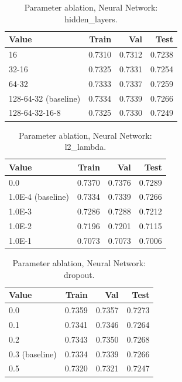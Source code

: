 
\begin{table}[ht]
\centering
\small
\caption{Parameter ablation, Neural Network: hidden\_layers.}
\label{tab:ablation-neural-hidden-layers}
\begin{tabular}{lrrr}
\toprule
Value & Train & Val & Test \\
\midrule
16 & 0.7310 & 0.7312 & 0.7238 \\
32-16 & 0.7325 & 0.7331 & 0.7254 \\
64-32 & 0.7333 & 0.7337 & 0.7259 \\
128-64-32 (baseline) & 0.7334 & 0.7339 & 0.7266 \\
128-64-32-16-8 & 0.7325 & 0.7330 & 0.7249 \\
\bottomrule
\end{tabular}
\end{table}

\begin{table}[ht]
\centering
\small
\caption{Parameter ablation, Neural Network: l2\_lambda.}
\label{tab:ablation-neural-l2-lambda}
\begin{tabular}{lrrr}
\toprule
Value & Train & Val & Test \\
\midrule
0.0 & 0.7370 & 0.7376 & 0.7289 \\
1.0E-4 (baseline) & 0.7334 & 0.7339 & 0.7266 \\
1.0E-3 & 0.7286 & 0.7288 & 0.7212 \\
1.0E-2 & 0.7196 & 0.7201 & 0.7115 \\
1.0E-1 & 0.7073 & 0.7073 & 0.7006 \\
\bottomrule
\end{tabular}
\end{table}

\begin{table}[ht]
\centering
\small
\caption{Parameter ablation, Neural Network: dropout.}
\label{tab:ablation-neural-dropout}
\begin{tabular}{lrrr}
\toprule
Value & Train & Val & Test \\
\midrule
0.0 & 0.7359 & 0.7357 & 0.7273 \\
0.1 & 0.7341 & 0.7346 & 0.7264 \\
0.2 & 0.7343 & 0.7350 & 0.7268 \\
0.3 (baseline) & 0.7334 & 0.7339 & 0.7266 \\
0.5 & 0.7320 & 0.7321 & 0.7247 \\
\bottomrule
\end{tabular}
\end{table}

